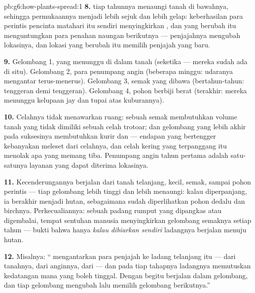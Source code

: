\begin{solution}{pb:g6:how-plants-spread:1}
\textbf{8.}  tiap tahunnya menaungi tanah di bawahnya,
sehingga permukaannya menjadi lebih sejuk dan lebih gelap: keberhasilan
para perintis pencinta matahari itu sendiri menyingkirkan ,
dan  yang berubah itu menguntungkan para penahan naungan
berikutnya --- penjajahnya mengubah lokasinya, dan lokasi yang berubah
itu memilih penjajah yang baru.

\textbf{9.} Gelombang 1,  yang menunggu di dalam tanah (seketika
--- mereka sudah ada di situ). Gelombang 2, para penumpang angin
(beberapa minggu: udaranya mengantar terus-menerus). Gelombang 3,
semak yang dibawa  (bertahun-tahun: tenggeran demi tenggeran).
Gelombang 4, pohon berbiji berat (terakhir: mereka menunggu kelupaan
 jay dan tupai atas kuburannya).

\textbf{10.} Celahnya tidak menawarkan ruang:  sebuah semak
membutuhkan volume tanah yang tidak dimiliki sebuah celah trotoar; dan
gelombang yang lebih akhir pada suksesinya membutuhkan kurir dan
 --- endapan  yang bertengger kebanyakan meleset dari
celahnya, dan celah kering yang terpanggang itu menolak apa yang
memang tiba. Penumpang angin tahun pertama adalah satu-satunya layanan
yang dapat diterima lokasinya.

\textbf{11.} Kecenderungannya berjalan dari tanah telanjang, 
kecil, semak, sampai pohon perintis --- tiap gelombang lebih tinggi
dan lebih menaungi: kalau diperpanjang, ia berakhir menjadi hutan,
sebagaimana sudah diperlihatkan pohon dedalu dan birchnya.
Perkecualiannya: sebuah padang rumput yang dipangkas atau digembalai,
tempat sentuhan manusia menyingkirkan gelombang semaknya setiap tahun
--- bukti bahwa hanya \emph{kalau dibiarkan sendiri} ladangnya berjalan
menuju hutan.

\textbf{12.} Misalnya: `` mengantarkan para penjajah ke
ladang telanjang itu --- dari tanahnya, dari anginnya, dari 
--- dan pada tiap tahapnya  ladangnya memutuskan kedatangan
mana yang boleh tinggal. Dengan begitu  berjalan dalam
gelombang, dan tiap gelombang mengubah  lalu memilih
gelombang berikutnya.''
\end{solution}
